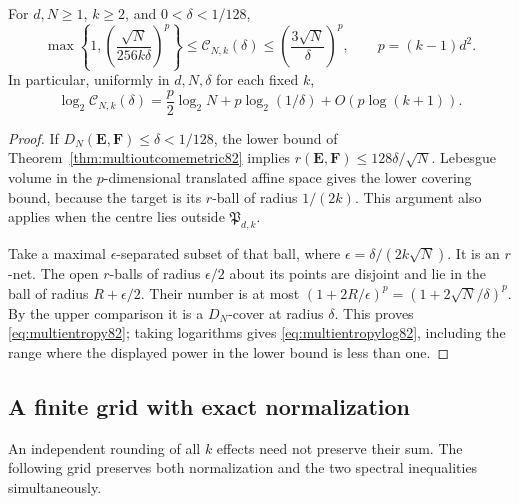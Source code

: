 \begin{theorem}
\label{thm:multioutcomeentropy82}
For $d,N\ge1$, $k\ge2$, and $0<\delta<1/128$,
\begin{equation}\label{eq:multientropy82}
 \max\left\{1,\left(\frac{\sqrt N}{256k\delta}\right)^p\right\}
 \le\mathcal C_{N,k}(\delta)
 \le\left(\frac{3\sqrt N}{\delta}\right)^p,
 \qquad p=(k-1)d^2.
\end{equation}
In particular, uniformly in $d,N,\delta$ for each fixed $k$,
\begin{equation}\label{eq:multientropylog82}
 \log_2\mathcal C_{N,k}(\delta)
 =\frac p2\log_2N+p\log_2(1/\delta)+O(p\log(k+1)).
\end{equation}
\end{theorem}
\begin{proof}
If $D_N(\boldsymbol E,\boldsymbol F)\le\delta<1/128$, the lower
bound of Theorem~\ref{thm:multioutcomemetric82} implies
$r(\boldsymbol E,\boldsymbol F)\le128\delta/\sqrt N$.
Lebesgue volume in the $p$-dimensional translated affine space gives
the lower covering bound, because the target is its $r$-ball of
radius $1/(2k)$.  This argument also applies when the centre lies
outside $\mathfrak P_{d,k}$.

Take a maximal $\epsilon$-separated subset of that ball, where
$\epsilon=\delta/(2k\sqrt N)$.  It is an $r$-net.  The open
$r$-balls of radius $\epsilon/2$ about its points are disjoint and
lie in the ball of radius $R+\epsilon/2$.  Their number is at most
$(1+2R/\epsilon)^p=(1+2\sqrt N/\delta)^p$.
By the upper comparison it is a $D_N$-cover at radius $\delta$.
This proves \eqref{eq:multientropy82}; taking logarithms gives
\eqref{eq:multientropylog82}, including the range where the displayed
power in the lower bound is less than one.
\end{proof}

\subsection{A finite grid with exact normalization}
An independent rounding of all $k$ effects need not preserve their
sum.  The following grid preserves both normalization and the two
spectral inequalities simultaneously.

